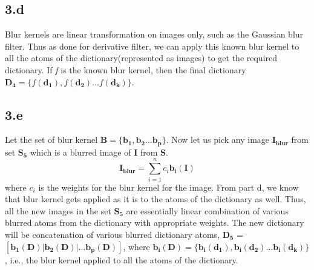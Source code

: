 \documentclass[12pt]{article}
\begin{document}
\subsection*{3.d}
Blur kernels are linear transformation on images only, such as the Gaussian blur filter. Thus as done for derivative filter, we can apply this known blur kernel to all the atoms of the dictionary(represented as images) to get the required dictionary. If \textit{f} is the known blur kernel, then the final dictionary $\boldsymbol{D_4} = \{f(\boldsymbol{d_1}), f(\boldsymbol{d_2})... f(\boldsymbol{d_k})\}$.
\subsection*{3.e}
Let the set of blur kernel $\boldsymbol{B} = \{\boldsymbol{b_1}, \boldsymbol{b_2}... \boldsymbol{b_p}\}$. Now let us pick any image $\boldsymbol{I_{blur}}$ from set $\boldsymbol{S_5}$ which is a blurred image of $\boldsymbol{I}$ from $\boldsymbol{S}$.
\begin{equation*}
    \boldsymbol{I_{blur}} = \sum_{i=1}^{n}c_i\boldsymbol{b_i(I)}
\end{equation*}
where $c_i$ is the weights for the blur kernel for the image. From part d, we know that blur kernel gets applied as it is to the atoms of the dictionary as well. Thus, all the new images in the set $\boldsymbol{S_5}$ are essentially linear combination of various blurred atoms from the dictionary with appropriate weights. The new dictionary will be concatenation of various blurred dictionary atoms, $\boldsymbol{D_5}$ = $[\boldsymbol{b_1(D)}| \boldsymbol{b_2(D)}|... \boldsymbol{b_p(D)}]$, where $\boldsymbol{b_i(D)} = \{\boldsymbol{b_i(d_1)}, \boldsymbol{b_i(d_2)}... \boldsymbol{b_i(d_k)}\}$, i.e., the blur kernel applied to all the atoms of the dictionary.
\end{document}
